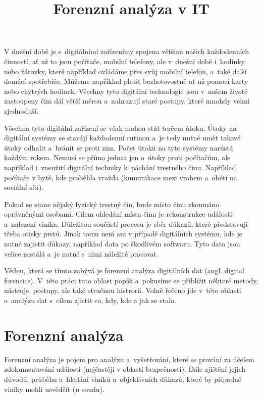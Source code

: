 \documentclass[thesis=B,czech]{FITthesis}[2012/06/26]
\title{Forenzní analýza v IT}
\begin{document}

\begin{introduction}
  \label{sec:uvod}

V dnešní době je s~digitálními zařízenímy spojena většina našich každodenních činností, ať už to jsou  počítače, mobilní telefony, ale v~dnešní době i~hodinky nebo žárovky, které například ovládáme přes svůj mobilní telefon, a~také další domácí spotřebiče. Můžeme například platit bezhotovostně ať už pomocí karty nebo chytrých hodinek. Všechny tyto digitální technologie jsou v~našem životě zastoupeny čím dál větší měrou a~nahrazují staré postupy, které mnohdy velmi zjednoduší. 

Všechna tyto digitální zařízení se však mohou stát terčem útoku. Útoky na digitální systémy se stavájí každodenní rutinou a~je tedy nutné umět takové útoky odhalit a~bránit se proti nim. Počet útoků na tyto systémy narůstá každým rokem. Nemusí se přímo jednat jen o~útoky proti počítačům, ale například i~zneužití digitální techniky k~páchání trestného činu. Například počítače v bytě, kde proběhla vražda (kumunikace mezi vrahem a~obětí na sociální síti).

Pokud se stane nějaký fyzický trestný čin, bude místo činu zkoumáno oprávněnými osobami. Cílem ohledání místa činu je rekonstrukce události a~nalezení viníka. Důležitou součástí procesu je sběr důkazů, které představují třeba otisky prstů. Jinak tomu není ani v případě digitálních systému, kde je nutné zajistit důkazy, například data po škodlivém softwaru. Tyto data jsou velice nestálá a~je nutné s~nimi náležitě pracovat.

Vědou, která se tímto zabývá je forenzní analýza digitálních dat (angl. digital forensics). V~této práci tuto oblast popíši a~pokusíme se příblížit některé metody, nástroje, postupy, ale také stručnou histrorii. Volně řečeno jde v~této oblasti o~analýzu dat s~cílem zjistit co, kdy, kde a jak se stalo.
 

\end{introduction}

\chapter{Forenzní analýza}
Forenzní analýza je pojem pro analýzu a~vyšetřování, které se prování za účelem zdokumentování události (nejčastěji v oblasti bezpečnosti). Dále zjištění jejich důvodů, průběhu a~hledání viníků a~objektivních důkazů, které by případné viníky mohli usvědčit (u soudu)\cite{for_uvod}.
\end{document}
